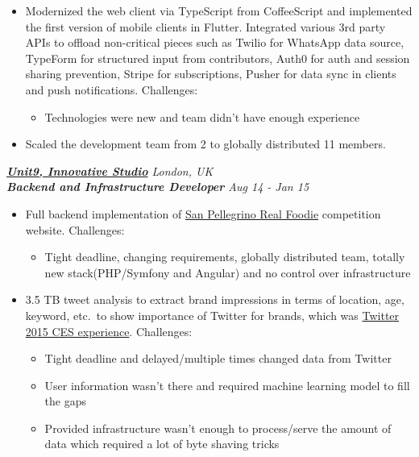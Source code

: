 \documentclass[line, margin]{res}
\begin{document}
\begin{resume}
\begin{itemize}
	\item{Modernized the web client via TypeScript from CoffeeScript and implemented the first version of mobile clients in Flutter. Integrated various 3rd party APIs to offload non-critical pieces such as Twilio for WhatsApp data source, TypeForm for structured input from contributors, Auth0 for auth and session sharing prevention, Stripe for subscriptions, Pusher for data sync in clients and push notifications. Challenges:}
		\begin{itemize} \itemsep -5pt \small
		\vspace{-.2cm}
		\item Technologies were new and team didn't have enough experience
		\end{itemize}		
				
	\item Scaled the development team from 2 to globally distributed 11 members.
\end{itemize}

{\sl \textbf{\href{http://www.unit9.com/}{Unit9, Innovative Studio}} \hfill London, UK} \\
{\sl \textbf{Backend and Infrastructure Developer} \hfill Aug 14 - Jan 15} \\

\vspace{-0.3cm}
\begin{itemize} \itemsep -5pt
	\item{Full backend implementation of \href{https://www.unit9.com/project/san-pellegrino-are-you-a-real-foodie/}{San Pellegrino Real Foodie} competition website. Challenges:}
		\begin{itemize} \itemsep -5pt \small
		\vspace{-.2cm}
		\item Tight deadline, changing requirements, globally distributed team, totally new stack(PHP/Symfony  and Angular) and no control over infrastructure
		\end{itemize}
	
	\item 3.5 TB tweet analysis to extract brand impressions in terms of location, age, keyword, etc.\ to show importance of Twitter for brands, which was \href{http://www.unit9.com/innovation/twitter-ces-experience}{Twitter 2015 CES experience}. Challenges:
		\begin{itemize} \itemsep -5pt \small
		\vspace{-.2cm}
		\item Tight deadline and delayed/multiple times changed data from Twitter
		\item User information wasn't there and required machine learning model to fill the gaps
		\item Provided infrastructure wasn't enough to process/serve the amount of data which required a lot of byte shaving tricks
		\end{itemize}


\end{itemize}
\end{resume}
\end{document}
